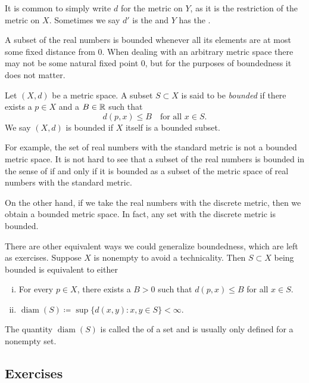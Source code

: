 It is common to simply write $d$ for the metric on $Y$, as it is 
the restriction of the metric on $X$.  Sometimes we say $d'$ is
the \emph{} and $Y$ has the
\emph{}.

\medskip

A subset of the real
numbers is bounded whenever all its elements are at most some fixed distance
from 0.
When dealing with an arbitrary metric space there may not be some
natural fixed point 0, but for the purposes of boundedness it does not matter.

\begin{defn}
Let $(X,d)$ be a metric space.  A subset $S \subset X$ is said to be
\emph{bounded} if there exists a $p \in X$ and a
$B \in {\mathbb{R}}$ such that
\begin{equation*}
d(p,x) \leq B \quad \text{for all } x \in S.
\end{equation*}
We say $(X,d)$ is bounded if $X$ itself is a bounded subset.
\end{defn}

For example, the set of real numbers with the standard metric is not a
bounded metric space.  It is not hard to see that a
subset of the real numbers is bounded in the
sense of  if and only if it is bounded as a subset of the
metric space of real numbers with the standard metric.

On the other hand, if we take the real numbers with the discrete metric,
then we obtain a bounded metric space.  In fact, any set with the
discrete metric is bounded.

There are other equivalent ways we could generalize boundedness,
which are left as exercises.  Suppose $X$ is nonempty to avoid a technicality.
Then $S \subset X$ being bounded is equivalent to either
\begin{enumerate}[(i)]
\item
For every $p \in X$, there exists a $B > 0$ such that $d(p,x) \leq B$ for
all $x \in S$.
\item
{}%
$\operatorname{diam}(S) \coloneqq \sup \bigl\{ d(x,y) : x,y \in S \bigr\} < \infty$.
\end{enumerate}
The quantity $\operatorname{diam}(S)$ is called the
\emph{} of a set and is usually only defined for
a nonempty set.

\subsection{Exercises}

